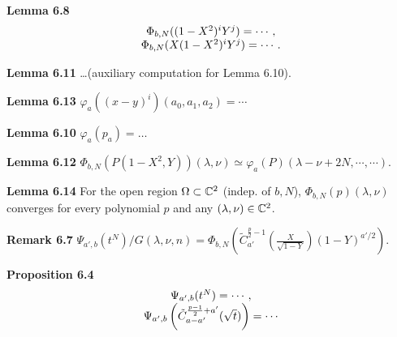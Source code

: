 \documentclass[12pt,landscape]{article} %
\begin{document}
{\bf Lemma 6.8}\begin{equation*}
	\begin{array}[]{c}
		\Phi_{b,N}( (1-X^2)^iY^j)=\cdots,\\
		\Phi_{b,N}(X(1-X^2)^iY^j)=\cdots.\\
	\end{array}
\end{equation*}

{\bf Lemma 6.11} \ldots(auxiliary computation for Lemma 6.10).

{\bf Lemma 6.13} $\varphi_a( (x-y)^i)(a_0,a_1,a_2)=\cdots$

{\bf Lemma 6.10} $\varphi_a(p_a)=\ldots$

{\bf Lemma 6.12} $\Phi_{b,N}\left( P(1-X^2,Y) \right)(\lambda,\nu)\simeq \varphi_a(P)(\lambda-\nu+2N,\cdots,\cdots)$.

{\bf Lemma 6.14} For the open region $\Omega\subset \mathbb{C}^2$ (indep. of $b,N$), $\Phi_{b,N}(p)(\lambda,\nu)$ converges for every polynomial $p$ and any $(\lambda,\nu)\in\mathbb{C}^2$.

{\bf Remark 6.7} $\Psi_{a',b}(t^N)/G(\lambda,\nu,n)=\Phi_{b,N}\left( \tilde{C}_{a'}^{\frac{p}{2}-1}\left( \frac{X}{\sqrt{1-Y}} \right)(1-Y)^{a'/2} \right).$

{\bf Proposition 6.4} \begin{equation*}
	\begin{array}[]{c}
		\Psi_{a',b}(t^N)=\cdots,\\
		\Psi_{a',b}\left( \tilde{C}_{a-a'}^{\frac{p-1}{2}+a'}(\sqrt{t}) \right)=\cdots
	\end{array}
\end{equation*}
\end{document}
